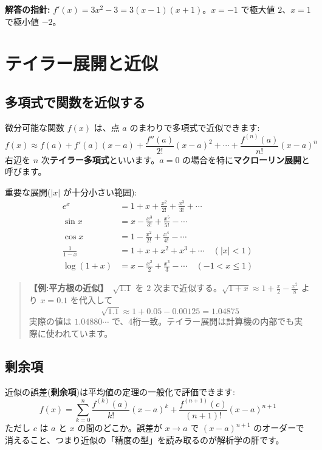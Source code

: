 \documentclass{article}
\begin{document}
\textbf{解答の指針:} \(f'(x) = 3x^2 - 3 = 3(x-1)(x+1)\)。\(x = -1\) で極大値 \(2\)、\(x = 1\) で極小値 \(-2\)。

\section{テイラー展開と近似}

\subsection{多項式で関数を近似する}

微分可能な関数 \(f(x)\) は、点 \(a\) のまわりで多項式で近似できます:
\[ f(x) \approx f(a) + f'(a)(x - a) + \frac{f''(a)}{2!}(x - a)^2 + \cdots + \frac{f^{(n)}(a)}{n!}(x - a)^n \]
右辺を \(n\) 次\textbf{テイラー多項式}といいます。\(a = 0\) の場合を特に\textbf{マクローリン展開}と呼びます。

重要な展開(\(|x|\) が十分小さい範囲):
\begin{align}
e^x &= 1 + x + \frac{x^2}{2!} + \frac{x^3}{3!} + \cdots \\
\sin x &= x - \frac{x^3}{3!} + \frac{x^5}{5!} - \cdots \\
\cos x &= 1 - \frac{x^2}{2!} + \frac{x^4}{4!} - \cdots \\
\frac{1}{1-x} &= 1 + x + x^2 + x^3 + \cdots \quad (|x| < 1) \\
\log(1+x) &= x - \frac{x^2}{2} + \frac{x^3}{3} - \cdots \quad (-1 < x \le 1)
\end{align}

\begin{quote}
\textbf{【例:平方根の近似】}\ \(\sqrt{1.1}\) を \(2\) 次まで近似する。\(\sqrt{1+x} \approx 1 + \frac{x}{2} - \frac{x^2}{8}\) より \(x = 0.1\) を代入して
\[ \sqrt{1.1} \approx 1 + 0.05 - 0.00125 = 1.04875 \]
実際の値は \(1.04880\cdots\) で、4桁一致。テイラー展開は計算機の内部でも実際に使われています。
\end{quote}

\subsection{剰余項}

近似の誤差(\textbf{剰余項})は平均値の定理の一般化で評価できます:
\[ f(x) = \sum_{k=0}^{n} \frac{f^{(k)}(a)}{k!}(x-a)^k + \frac{f^{(n+1)}(c)}{(n+1)!}(x-a)^{n+1} \]
ただし \(c\) は \(a\) と \(x\) の間のどこか。誤差が \(x \to a\) で \((x-a)^{n+1}\) のオーダーで消えること、つまり近似の「精度の型」を読み取るのが解析学の肝です。
\end{document}
